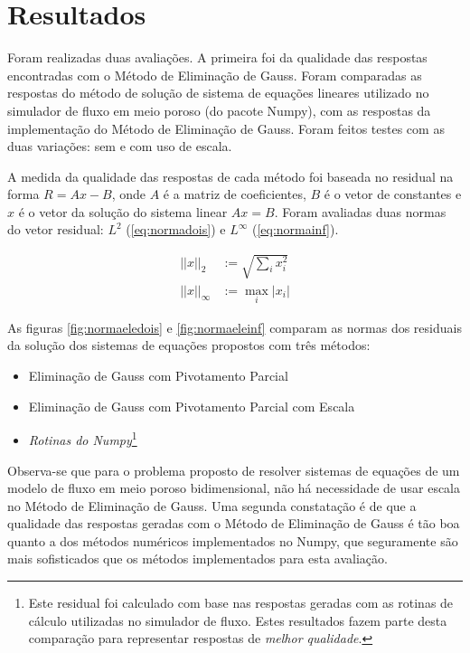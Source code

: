 \documentclass[final,5p]{elsarticle}
\numberwithin{equation}{section}
\begin{document}
\section{Resultados}

        Foram realizadas duas avaliações. A primeira foi da qualidade das respostas encontradas com o Método de Eliminação de Gauss. Foram comparadas as respostas do método de solução de sistema de equações lineares utilizado no simulador de fluxo em meio poroso (do pacote Numpy), com as respostas da implementação do Método de Eliminação de Gauss. Foram feitos testes com as duas variações: sem e com uso de escala.

        A medida da qualidade das respostas de cada método foi baseada no residual na forma $R = Ax-B$, onde $A$ é a matriz de coeficientes, $B$ é o vetor de constantes e $x$ é o vetor da solução do sistema linear $Ax=B$. Foram avaliadas duas normas do vetor residual: $L^2$ (\ref{eq:normadois}) e $L^\infty$ (\ref{eq:normainf}).

        \begin{align}
            ||x||_2 &:= \sqrt{\sum_{i}x_i^2} \label{eq:normadois} \\
            ||x||_\infty &:= \max_{i} |x_i| \label{eq:normainf}
        \end{align}

        As figuras \ref{fig:normaeledois} e \ref{fig:normaeleinf} comparam as normas dos residuais da solução dos sistemas de equações propostos com três métodos:
        \begin{itemize}
            \item Eliminação de Gauss com Pivotamento Parcial
            \item Eliminação de Gauss com Pivotamento Parcial com Escala
            \item \emph{Rotinas do Numpy}\footnote{Este residual foi calculado com base nas respostas geradas com as rotinas de cálculo utilizadas no simulador de fluxo. Estes resultados fazem parte desta comparação para representar respostas de \emph{melhor qualidade}.}
        \end{itemize}

        Observa-se que para o problema proposto de resolver sistemas de equações de um modelo de fluxo em meio poroso bidimensional, não há necessidade de usar escala no Método de Eliminação de Gauss. Uma segunda constatação é de que a qualidade das respostas geradas com o Método de Eliminação de Gauss é tão boa quanto a dos métodos numéricos implementados no Numpy, que seguramente são mais sofisticados que os métodos implementados para esta avaliação.
\end{document}
